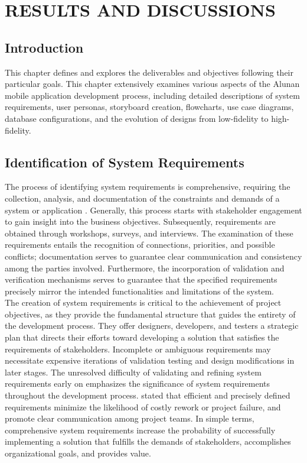 \chapter{RESULTS AND DISCUSSIONS}
\label{ch:results}

\section{Introduction}
This chapter defines and explores the deliverables and objectives following their particular goals. This chapter extensively examines various aspects of the Alunan mobile application development process, including detailed descriptions of system requirements, user personas, storyboard creation, flowcharts, use case diagrams, database configurations, and the evolution of designs from low-fidelity to high-fidelity.

\section{Identification of System Requirements}
The process of identifying system requirements is comprehensive, requiring the collection, analysis, and documentation of the constraints and demands of a system or application \parencite{mokos20}. Generally, this process starts with stakeholder engagement to gain insight into the business objectives. Subsequently, requirements are obtained through workshops, surveys, and interviews. The examination of these requirements entails the recognition of connections, priorities, and possible conflicts; documentation serves to guarantee clear communication and consistency among the parties involved. Furthermore, the incorporation of validation and verification mechanisms serves to guarantee that the specified requirements precisely mirror the intended functionalities and limitations of the system. \\

The creation of system requirements is critical to the achievement of project objectives, as they provide the fundamental structure that guides the entirety of the development process. They offer designers, developers, and testers a strategic plan that directs their efforts toward developing a solution that satisfies the requirements of stakeholders. Incomplete or ambiguous requirements may necessitate expensive iterations of validation testing and design modifications in later stages. The unresolved difficulty of validating and refining system requirements early on emphasizes the significance of system requirements throughout the development process. \textcite{mokos20} stated that efficient and precisely defined requirements minimize the likelihood of costly rework or project failure, and promote clear communication among project teams. In simple terms, comprehensive system requirements increase the probability of successfully implementing a solution that fulfills the demands of stakeholders, accomplishes organizational goals, and provides value.

